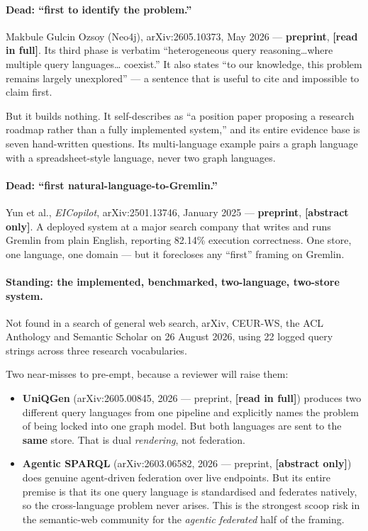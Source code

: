 \documentclass[11pt,a4paper]{article}
\newcommand{\readtag}{\textcolor{standing}{\textbf{[read in full]}}}
\newcommand{\abstag}{\textcolor{partial}{\textbf{[abstract only]}}}
\begin{document}
\paragraph{Dead: ``first to identify the problem.''} Makbule Gulcin Ozsoy (Neo4j),
arXiv:2605.10373, May 2026 --- \textbf{preprint}, \readtag. Its third phase is
verbatim ``heterogeneous query reasoning\ldots where multiple query languages\ldots
coexist.'' It also states ``to our knowledge, this problem remains largely
unexplored'' --- a sentence that is useful to cite and impossible to claim first.

But it builds nothing. It self-describes as ``a position paper proposing a research
roadmap rather than a fully implemented system,'' and its entire evidence base is
seven hand-written questions. Its multi-language example pairs a graph language
with a spreadsheet-style language, never two graph languages.

\paragraph{Dead: ``first natural-language-to-Gremlin.''} Yun et al.,
\emph{EICopilot}, arXiv:2501.13746, January 2025 --- \textbf{preprint}, \abstag. A
deployed system at a major search company that writes and runs Gremlin from plain
English, reporting 82.14\% execution correctness. One store, one language, one
domain --- but it forecloses any ``first'' framing on Gremlin.

\paragraph{Standing: the implemented, benchmarked, two-language, two-store system.}
Not found in a search of general web search, arXiv, CEUR-WS, the ACL Anthology and
Semantic Scholar on 26 August 2026, using 22 logged query strings across three
research vocabularies.

Two near-misses to pre-empt, because a reviewer will raise them:

\begin{itemize}
\item \textbf{UniQGen} (arXiv:2605.00845, 2026 --- preprint, \readtag) produces two
      different query languages from one pipeline and explicitly names the problem
      of being locked into one graph model. But both languages are sent to the
      \textbf{same} store. That is dual \emph{rendering}, not federation.
\item \textbf{Agentic SPARQL} (arXiv:2603.06582, 2026 --- preprint, \abstag) does
      genuine agent-driven federation over live endpoints. But its entire premise
      is that its one query language is standardised and federates natively, so the
      cross-language problem never arises. This is the strongest scoop risk in the
      semantic-web community for the \emph{agentic federated} half of the framing.
\end{itemize}
\end{document}
